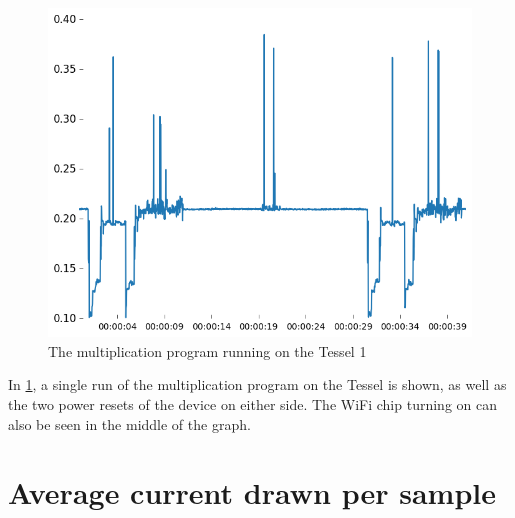 \clearpage

\begin{figure}[h!]
\centering
\includegraphics[scale=0.6]{fig/graphs/tessel_multi.png}
\caption{The multiplication program running on the Tessel 1}
\label{fig:multtes}
\end{figure}
In \cref{fig:multtes}, a single run of the multiplication program on the Tessel is shown, as well as the two power resets of the device on either side.
The WiFi chip turning on can also be seen in the middle of the graph.


\section{Average current drawn per sample}
\label{sec:avgcurrent}




